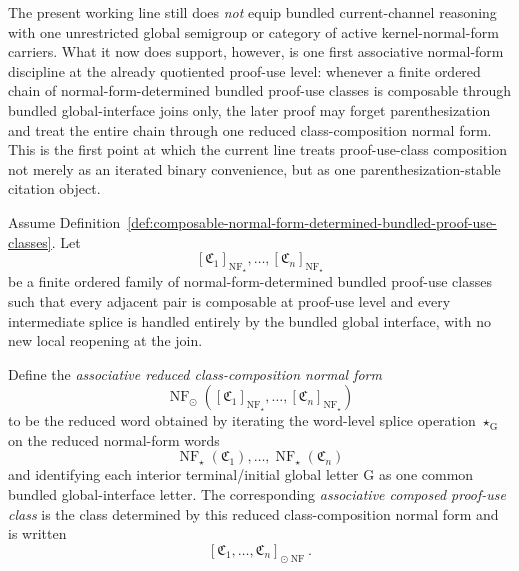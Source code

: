 \begin{remark}
\label{rem:status-of-the-first-associative-proof-use-class-normal-form-step}
The present working line still does \emph{not} equip bundled current-channel reasoning with one unrestricted global semigroup or category of active kernel-normal-form carriers. What it now does support, however, is one first associative normal-form discipline at the already quotiented proof-use level: whenever a finite ordered chain of normal-form-determined bundled proof-use classes is composable through bundled global-interface joins only, the later proof may forget parenthesization and treat the entire chain through one reduced class-composition normal form. This is the first point at which the current line treats proof-use-class composition not merely as an iterated binary convenience, but as one parenthesization-stable citation object.
\end{remark}

\begin{definition}
\label{def:associative-reduced-class-composition-normal-form}
Assume Definition~\ref{def:composable-normal-form-determined-bundled-proof-use-classes}. Let
\[
[\mathfrak C_1]_{\operatorname{NF}_{\star}},\dots,[\mathfrak C_n]_{\operatorname{NF}_{\star}}
\]
be a finite ordered family of normal-form-determined bundled proof-use classes such that every adjacent pair is composable at proof-use level and every intermediate splice is handled entirely by the bundled global interface, with no new local reopening at the join.

Define the \emph{associative reduced class-composition normal form}
\[
\operatorname{NF}_{\odot}([\mathfrak C_1]_{\operatorname{NF}_{\star}},\dots,[\mathfrak C_n]_{\operatorname{NF}_{\star}})
\]
to be the reduced word obtained by iterating the word-level splice operation \(\star_{\mathrm G}\) on the reduced normal-form words
\[
\operatorname{NF}_{\star}(\mathfrak C_1),\dots,\operatorname{NF}_{\star}(\mathfrak C_n)
\]
and identifying each interior terminal/initial global letter \(\mathrm G\) as one common bundled global-interface letter. The corresponding \emph{associative composed proof-use class} is the class determined by this reduced class-composition normal form and is written
\[
[\mathfrak C_1,\dots,\mathfrak C_n]_{\odot\operatorname{NF}}.
\]
\end{definition}

